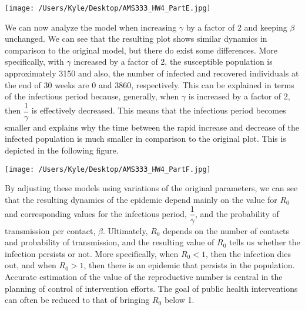 \documentclass[12pt]{article}
\begin{document}
\begin{center}
   \texttt{[image: /Users/Kyle/Desktop/AMS333\_HW4\_PartE.jpg]}
\end{center}


We can now analyze the model when increasing ${\gamma}$ by a factor of 2 and keeping ${\beta}$ unchanged. We can see that the resulting plot shows similar dynamics in comparison to the original model, but there do exist some differences. More specifically, with ${\gamma}$ increased by a factor of 2, the susceptible population is approximately 3150 and also, the number of infected and recovered individuals at the end of 30 weeks are 0 and 3860, respectively. This can be explained in terms of the infectious period because, generally, when ${\gamma}$ is increased by a factor of 2, then $\dfrac{1}{\gamma}$ is effectively decreased. This means that the infectious period becomes smaller and explains why the time between the rapid increase and decrease of the infected population is much smaller in comparison to the original plot. This is depicted in the following figure.
\begin{center}
   \texttt{[image: /Users/Kyle/Desktop/AMS333\_HW4\_PartF.jpg]}
\end{center}

By adjusting these models using variations of the original parameters, we can see that the resulting dynamics of the epidemic depend mainly on the value for $R_0$ and corresponding values for the infectious period, $\dfrac{1}{\gamma}$, and the probability of transmission per contact, ${\beta}$. Ultimately, $R_0$ depends on the number of contacts and probability of transmission, and the resulting value of $R_0$ tells us whether the infection persists or not. More specifically, when $R_0<1$, then the infection dies out, and when $R_0>1$, then there is an epidemic that persists in the population. Accurate estimation of the value of the reproductive number is central in the planning of control of intervention efforts. The goal of public health interventions can often be reduced to that of bringing $R_0$ below 1. 
\end{document}
